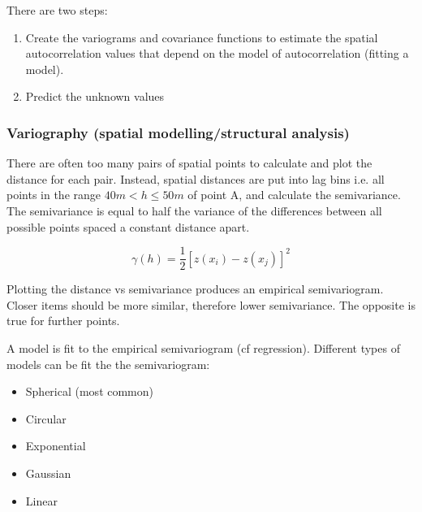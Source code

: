 \documentclass{article}
\begin{document}
There are two steps:

\begin{enumerate}
    \item Create the variograms and covariance functions to estimate the spatial autocorrelation values that depend on the model of autocorrelation (fitting a model).
    \item Predict the unknown values
\end{enumerate}

\subsubsection{Variography (spatial modelling/structural analysis)}

There are often too many pairs of spatial points to calculate and plot the distance for each pair.
Instead, spatial distances are put into lag bins i.e. all points in the range $40m < h \le 50m$ of point A, and calculate the semivariance.
The semivariance is equal to half the variance of the differences between all possible points spaced a constant distance apart.

\[\gamma (h) = \frac{1}{2}[z(x_{i}) - z(x_{j})]^2\]

Plotting the distance vs semivariance produces an empirical semivariogram.
Closer items should be more similar, therefore lower semivariance.
The opposite is true for further points.

A model is fit to the empirical semivariogram (cf regression).
Different types of models can be fit the the semivariogram:

\begin{itemize}
    \item Spherical (most common)
    \item Circular
    \item Exponential
    \item Gaussian
    \item Linear
\end{itemize}
\end{document}
